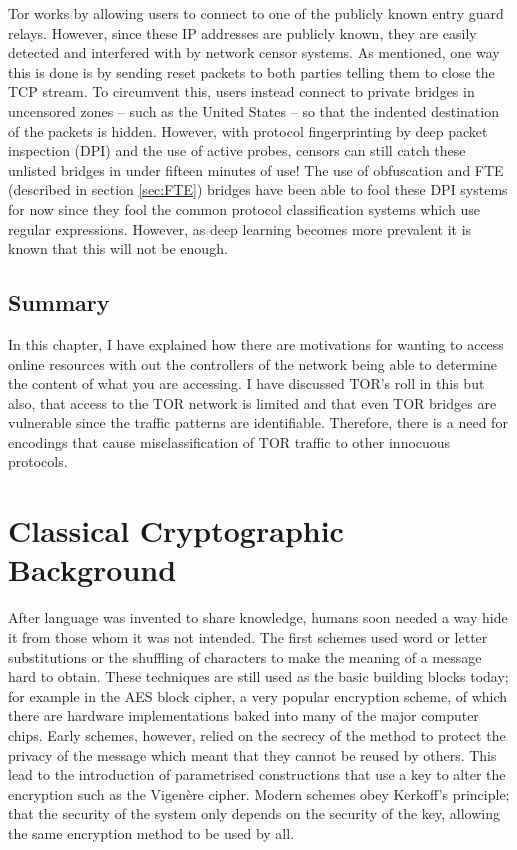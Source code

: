 \documentclass[ %
                    author={Samuel Russell},
                supervisor={Prof. Bogdan Warinschi},
                    degree={MEng},
                     title={Innocuous Ciphertexts},
                  subtitle={The DE-CENSOR Scheme},
                      type={Research},
                      year={2018} ]{dissertation}
\begin{document}
Tor works by allowing users to connect to one of the publicly known entry guard relays. However, since these IP addresses are publicly known, they are easily detected and interfered with by network censor systems. As mentioned, one way this is done is by sending reset packets to both parties telling them to close the TCP stream.
To circumvent this, users instead connect to private bridges in uncensored zones -- such as the United States -- so that the indented destination of the packets is hidden. However, with protocol fingerprinting by deep packet inspection (DPI) and the use of active probes, censors can still catch these unlisted bridges in under fifteen minutes of use!
The use of obfuscation and FTE (described in section \ref{sec:FTE}) bridges have been able to fool these DPI systems for now since they fool the common protocol classification systems which use regular expressions. However, as deep learning becomes more prevalent it is known that this will not be enough.

\section{Summary}

In this chapter, I have explained how there are motivations for wanting to access online resources with out the controllers of the network being able to determine the content of what you are accessing. I have discussed TOR's roll in this but also, that access to the TOR network is limited and that even TOR bridges are vulnerable since the traffic patterns are identifiable. Therefore, there is a need for encodings that cause misclassification of TOR traffic to other innocuous protocols.


\chapter{Classical Cryptographic Background}
\label{chap:technical}

After language was invented to share knowledge, humans soon needed a way hide it from those whom it was not intended. The first schemes used word or letter substitutions or the shuffling of characters to make the meaning of a message hard to obtain. These techniques are still used as the basic building blocks today; for example in the AES block cipher, a very popular encryption scheme, of which there are hardware implementations baked into many of the major computer chips. Early schemes, however, relied on the secrecy of the method to protect the privacy of the message which meant that they cannot be reused by others. This lead to the introduction of parametrised constructions that use a key to alter the encryption such as the Vigen\`ere cipher. Modern schemes obey Kerkoff's principle; that the security of the system only depends on the security of the key, allowing the same encryption method to be used by all.
\end{document}
